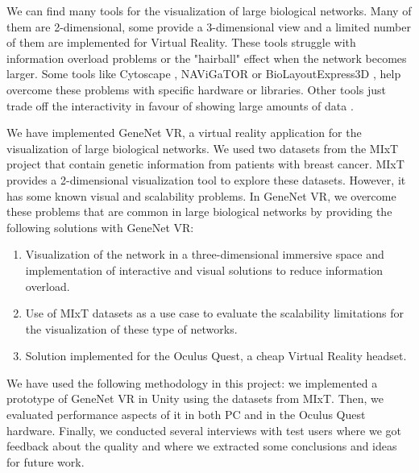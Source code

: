 
We can find many tools for the visualization of large biological networks. Many of them are 2-dimensional, some provide a 3-dimensional view and a limited number of them are implemented for Virtual Reality. These tools struggle with information overload problems or the "hairball" effect when the network becomes larger. Some tools like Cytoscape \cite{cytoscape}, NAViGaTOR \cite{navigator} or BioLayoutExpress3D \cite{biolayout3d}, help overcome these problems with specific hardware or libraries. Other tools just trade off the interactivity in favour of showing large amounts of data \cite{agapito_guzzi_cannataro_2013}.




We have implemented GeneNet VR, a virtual reality application for the visualization of large biological networks. We used two datasets from the MIxT project \cite{dumeaux_fjukstad_interactions_tumor_blood} that contain genetic information from patients with breast cancer. MIxT provides a 2-dimensional visualization tool to explore these datasets. However, it has some known visual and scalability problems. In GeneNet VR, we overcome these problems that are common in large biological networks by providing the following solutions with GeneNet VR:
\begin{enumerate}
  \item Visualization of the network in a three-dimensional immersive space and implementation of interactive and visual solutions to reduce information overload.
  \item Use of MIxT datasets as a use case to evaluate the scalability limitations for the visualization of these type of networks.
  \item Solution implemented for the Oculus Quest, a cheap Virtual Reality headset.
\end{enumerate}

We have used the following methodology in this project: we implemented a prototype of GeneNet VR in Unity using the datasets from MIxT. Then, we evaluated performance aspects of it in both PC and in the Oculus Quest hardware. Finally, we conducted several interviews with test users where we got feedback about the quality and where we extracted some conclusions and ideas for future work.

